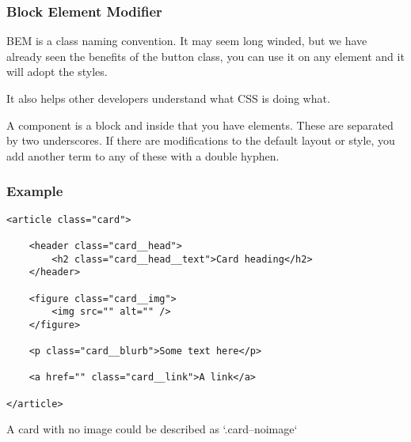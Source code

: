 \subsubsection{Block Element Modifier}

BEM is a class naming convention. It may seem long winded, but we have already seen the benefits of the button class, you can use it on any element and it will adopt the styles.

It also helps other developers understand what CSS is doing what.

A component is a block and inside that you have elements. These are separated by two underscores. If there are modifications to the default layout or style, you add another term to any of these with a double hyphen.

\subsubsection{Example}

\begin{verbatim}
<article class="card">

    <header class="card__head">
        <h2 class="card__head__text">Card heading</h2>
    </header>

    <figure class="card__img">
        <img src="" alt="" />
    </figure>

    <p class="card__blurb">Some text here</p>

    <a href="" class="card__link">A link</a>

</article>
\end{verbatim}

A card with no image could be described as `.card--noimage`

